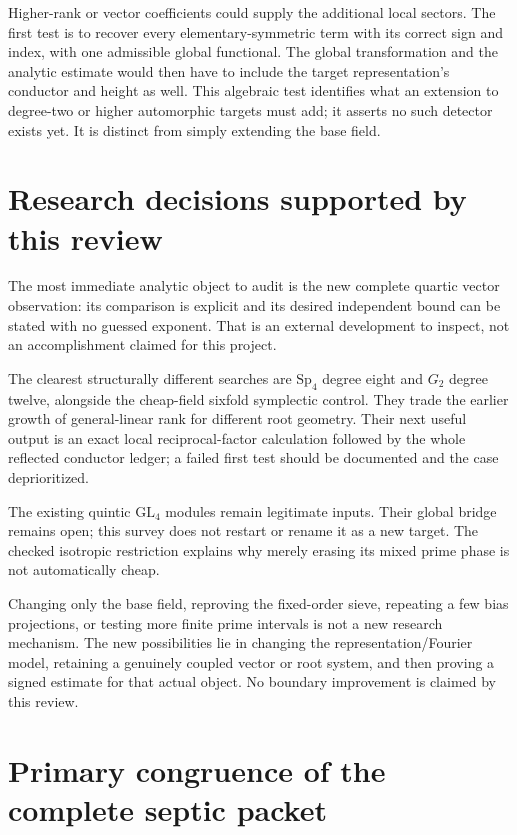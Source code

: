 \documentclass[11pt]{article}
\newcommand{\GL}{\mathrm{GL}}
\newcommand{\Sp}{\mathrm{Sp}}
\begin{document}
Higher-rank or vector coefficients could supply the additional local
sectors. The first test is to recover every elementary-symmetric term
with its correct sign and index, with one admissible global functional.
The global transformation and the analytic estimate would then have to
include the target representation's conductor and height as well.
This algebraic test identifies what an extension to degree-two or
higher automorphic targets must add; it asserts no such detector exists
yet. It is distinct from simply extending the base field.

\section{Research decisions supported by this review}

The most immediate analytic object to audit is the new complete quartic
vector observation: its comparison is explicit and its desired
independent bound can be stated with no guessed exponent.
That is an external development to inspect, not an accomplishment
claimed for this project.

The clearest structurally different searches are $\Sp_4$ degree eight
and $G_2$ degree twelve, alongside the cheap-field sixfold symplectic
control. They trade the earlier growth of general-linear rank for
different root geometry. Their next useful output is an exact local
reciprocal-factor calculation followed by the whole reflected conductor
ledger; a failed first test should be documented and the case deprioritized.

The existing quintic $\GL_4$ modules remain legitimate inputs.
Their global bridge remains open; this survey does not restart or
rename it as a new target. The checked isotropic restriction explains
why merely erasing its mixed prime phase is not automatically cheap.

Changing only the base field, reproving the fixed-order sieve, repeating
a few bias projections, or testing more finite prime intervals is not
a new research mechanism. The new possibilities lie in changing the
representation/Fourier model, retaining a genuinely coupled vector or
root system, and then proving a signed estimate for that actual object.
No boundary improvement is claimed by this review.

\section{Primary congruence of the complete septic packet}
\label{sec:septic-primary}
\end{document}
